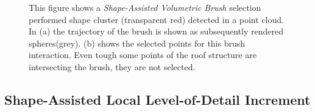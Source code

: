 \begin{figure}
\centering
{}\par\medskip
{}
\caption[Workflow of the Shape-Assisted Volumetric Brush. (a) shows the trajectory of the brush, (b) shows the selected points. ]
{This figure shows a \textit{Shape-Assisted Volumetric Brush} selection performed shape cluster (transparent red) detected in a point cloud. In (a) the trajectory of the brush is shown as subsequently rendered spheres(grey). (b) shows the selected points for this brush interaction. Even tough some points of the roof structure are intersecting the brush, they are not selected. }
\label{fig:brush}
\end{figure}


\subsection{Shape-Assisted Local Level-of-Detail Increment}
\label{sec:lod_increment}

